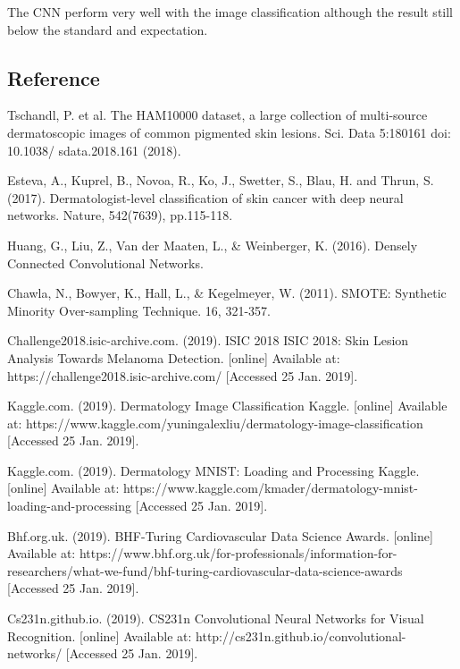 \documentclass[11pt]{article}
\begin{document}
The CNN perform very well with the image classification although the
result still below the standard and expectation.

    \subsection{Reference}\label{reference}

Tschandl, P. et al. The HAM10000 dataset, a large collection of
multi-source dermatoscopic images of common pigmented skin lesions. Sci.
Data 5:180161 doi: 10.1038/ sdata.2018.161 (2018).

Esteva, A., Kuprel, B., Novoa, R., Ko, J., Swetter, S., Blau, H. and
Thrun, S. (2017). Dermatologist-level classification of skin cancer with
deep neural networks. Nature, 542(7639), pp.115-118.

Huang, G., Liu, Z., Van der Maaten, L., \& Weinberger, K. (2016).
Densely Connected Convolutional Networks.

Chawla, N., Bowyer, K., Hall, L., \& Kegelmeyer, W. (2011). SMOTE:
Synthetic Minority Over-sampling Technique. 16, 321-357.

Challenge2018.isic-archive.com. (2019). ISIC 2018 \textbar{} ISIC 2018:
Skin Lesion Analysis Towards Melanoma Detection. {[}online{]} Available
at: https://challenge2018.isic-archive.com/ {[}Accessed 25 Jan. 2019{]}.

Kaggle.com. (2019). Dermatology Image Classification \textbar{} Kaggle.
{[}online{]} Available at:
https://www.kaggle.com/yuningalexliu/dermatology-image-classification
{[}Accessed 25 Jan. 2019{]}.

Kaggle.com. (2019). Dermatology MNIST: Loading and Processing \textbar{}
Kaggle. {[}online{]} Available at:
https://www.kaggle.com/kmader/dermatology-mnist-loading-and-processing
{[}Accessed 25 Jan. 2019{]}.

Bhf.org.uk. (2019). BHF-Turing Cardiovascular Data Science Awards.
{[}online{]} Available at:
https://www.bhf.org.uk/for-professionals/information-for-researchers/what-we-fund/bhf-turing-cardiovascular-data-science-awards
{[}Accessed 25 Jan. 2019{]}.

Cs231n.github.io. (2019). CS231n Convolutional Neural Networks for
Visual Recognition. {[}online{]} Available at:
http://cs231n.github.io/convolutional-networks/ {[}Accessed 25 Jan.
2019{]}.


    
    
    
    
\end{document}
